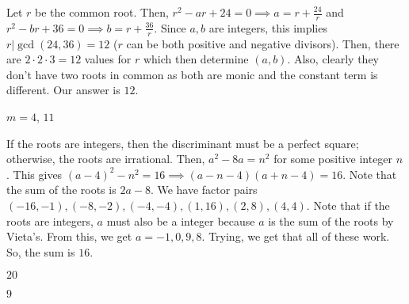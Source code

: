 \documentclass[11pt]{article}
\begin{document}
\begin{sol}
Let $r$ be the common root. Then, $r^2-ar+24=0\implies a = r + \frac{24}{r}$ and $r^2-br+36=0\implies b = r + \frac{36}{r}$. Since $a,b$ are integers, this implies $r|\gcd(24,36)=12$ ($r$ can be both positive and negative divisors). Then, there are $2\cdot 2\cdot 3 =12$ values for $r$ which then determine $(a,b)$. Also, clearly they don't have two roots in common as both are monic and the constant term is different. Our answer is $\boxed{12}$.
\end{sol}


\begin{sol}
$m=4$, $\boxed{11}$
\end{sol}


\begin{sol}
If the roots are integers, then the discriminant must be a perfect square; otherwise, the roots are irrational. Then, $a^2-8a=n^2$ for some positive integer $n$. This gives $(a-4)^2-n^2=16\implies (a-n-4)(a+n-4)=16$. Note that the sum of the roots is $2a-8$. We have factor pairs $(-16,-1),(-8,-2),(-4,-4),(1,16),(2,8),(4,4)$. Note that if the roots are integers, $a$ must also be a integer because $a$ is the sum of the roots by Vieta's. From this, we get $a=-1, 0, 9, 8$. Trying, we get that all of these work. So, the sum is $\boxed{16}$.
\end{sol}


\begin{sol}
$\boxed{20}$
\end{sol}


\begin{sol}
$\boxed{9}$
\end{sol}
\end{document}
